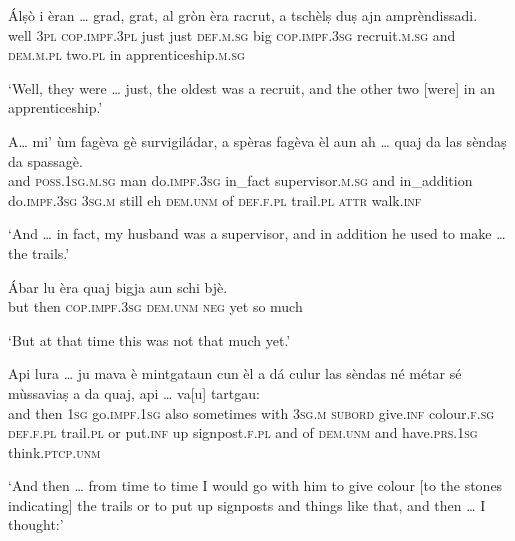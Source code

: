 \begin{linenumbers}
\gll   Álṣò i èran … grad, grat, al gròn èra racrut, a tschèlṣ duṣ ajn amprèndissadi. \\
well \textsc{3pl} \textsc{cop.impf.3pl} {} just just \textsc{def.m.sg} big \textsc{cop.impf.3sg} recruit.\textsc{m.sg} and  \textsc{dem.m.pl} two.\textsc{pl} in apprenticeship.\textsc{m.sg} \\
\end{linenumbers}
\medskip
\glt `Well, they were … just, the oldest was a recruit, and the other two [were] in an apprenticeship.'
\medskip

\begin{linenumbers}
\gll  A… mi' ùm fagèva gè survigiládar, a spèras fagèva èl aun ah … quaj da las sèndaṣ da spassagè.  \\
and \textsc{poss.1sg.m.sg} man do.\textsc{impf.3sg} in\_fact supervisor.\textsc{m.sg} and in\_addition do.\textsc{impf.3sg} \textsc{3sg.m} still eh {} \textsc{dem.unm} of \textsc{def.f.pl} trail.\textsc{pl} \textsc{attr} walk.\textsc{inf} \\
\end{linenumbers}
\medskip
\glt `And … in fact, my husband was a supervisor, and in addition he used to make … the trails.'
\medskip

\begin{linenumbers}
\gll  Ábar lu èra quaj bigja aun schi bjè.  \\
but then \textsc{cop.impf.3sg} \textsc{dem.unm} \textsc{neg} yet so much  \\
\end{linenumbers}
\medskip
\glt `But at that time this was not that much yet.'
\medskip

\begin{linenumbers}
\gll  Api lura … ju mava è mintgataun cun èl a dá culur las sèndas né métar sé mùssaviaṣ a da quaj, api … va[u] tartgau:  \\
and then {} \textsc{1sg} go.\textsc{impf.1sg} also sometimes with \textsc{3sg.m} \textsc{subord} give.\textsc{inf} colour.\textsc{f.sg} \textsc{def.f.pl} trail.\textsc{pl} or put.\textsc{inf} up signpost.\textsc{f.pl} and of \textsc{dem.unm} and {} have.\textsc{prs.1sg}  think.\textsc{ptcp.unm} \\
\end{linenumbers}
\medskip
\glt `And then … from time to time I would go with him to give colour [to the stones indicating] the trails or to put up signposts and things like that, and then … I thought:'
\medskip

